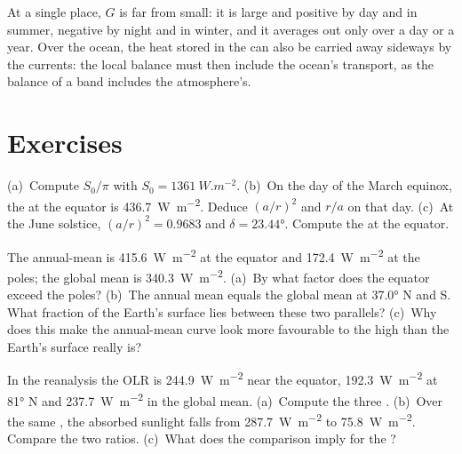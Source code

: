 \begin{remark}\label{rem:b1:radiation-heat-transport:local}
At a single place, $G$ is far from small: it is large and positive by day and in
summer, negative by night and in winter, and it averages out only over a day or a
year. Over the ocean, the heat stored in the  can also be carried away
sideways by the currents: the local balance must then include the ocean's
transport, as the balance of a  band includes the atmosphere's.
\end{remark}

\section{Exercises}

\begin{exercise}[$\star$]\label{exo:b1:radiation-heat-transport:1}
(a)~Compute $S_0/\pi$ with $S_0 = \qty{1361}{W.m^{-2}}$. (b)~On the day of the March
equinox, the  at the equator is \qty{436.7}{W.m^{-2}}. Deduce
$(a/r)^2$ and $r/a$ on that day. (c)~At the June solstice, $(a/r)^2 = 0.9683$ and
$\delta = \ang{23.44}$. Compute the  at the equator.
\end{exercise}

\begin{exercise}[$\star$]\label{exo:b1:radiation-heat-transport:2}
The annual-mean  is \qty{415.6}{W.m^{-2}} at the equator and
\qty{172.4}{W.m^{-2}} at the poles; the global mean is \qty{340.3}{W.m^{-2}}.
(a)~By what factor does the equator exceed the poles? (b)~The annual mean equals the
global mean at \ang{37.0} N and S. What fraction of the Earth's surface lies between
these two parallels? (c)~Why does this make the annual-mean curve look more
favourable to the high  than the Earth's surface really is?
\end{exercise}

\begin{exercise}[$\star$]\label{exo:b1:radiation-heat-transport:3}
In the reanalysis the OLR is \qty{244.9}{W.m^{-2}} near the equator,
\qty{192.3}{W.m^{-2}} at \ang{81} N and \qty{237.7}{W.m^{-2}} in the global mean.
(a)~Compute the three . (b)~Over the same , the
absorbed sunlight falls from \qty{287.7}{W.m^{-2}} to \qty{75.8}{W.m^{-2}}. Compare
the two ratios. (c)~What does the comparison imply for the ?
\end{exercise}

